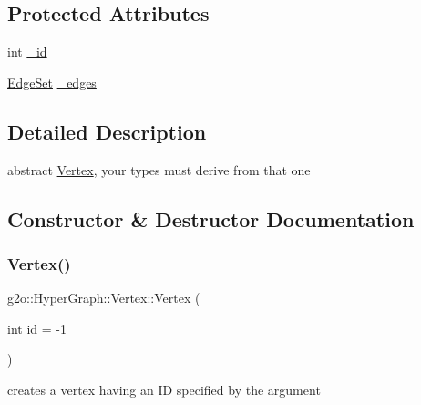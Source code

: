 \subsection*{Protected Attributes}
\begin{DoxyCompactItemize}
\item 
int \mbox{\hyperlink{classg2o_1_1_hyper_graph_1_1_vertex_ac643fa36a6d666d64925281b11de9b92}{\+\_\+id}}
\item 
\mbox{\hyperlink{classg2o_1_1_hyper_graph_a5e2970e236c0dcb4eff7c205d7b6b4ae}{Edge\+Set}} \mbox{\hyperlink{classg2o_1_1_hyper_graph_1_1_vertex_a8d732ebb72a545332a5bdc478b558430}{\+\_\+edges}}
\end{DoxyCompactItemize}


\subsection{Detailed Description}
abstract \mbox{\hyperlink{classg2o_1_1_hyper_graph_1_1_vertex}{Vertex}}, your types must derive from that one 

\subsection{Constructor \& Destructor Documentation}
\mbox{\label{classg2o_1_1_hyper_graph_1_1_vertex_a7f2e986815608e5ac4a44671ed9794ae}} 
\subsubsection{\texorpdfstring{Vertex()}{Vertex()}}
{\footnotesize\ttfamily g2o\+::\+Hyper\+Graph\+::\+Vertex\+::\+Vertex (\begin{DoxyParamCaption}\item[{int}]{id = {\ttfamily -\/1} }\end{DoxyParamCaption})\hspace{0.3cm}{\ttfamily [explicit]}}



creates a vertex having an ID specified by the argument 

\mbox{\label{classg2o_1_1_hyper_graph_1_1_vertex_a4c3da5bcc97c960c43bc49cc2ade649c}} 
